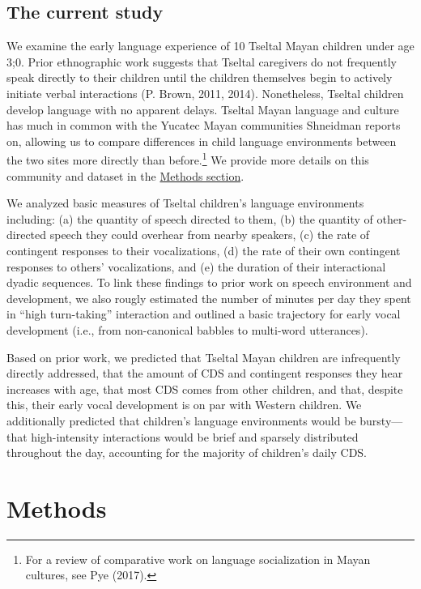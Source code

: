 \documentclass[floatsintext,man]{apa6}
\theoremstyle{definition}
\theoremstyle{definition}
\theoremstyle{definition}
\theoremstyle{remark}
\begin{document}
\subsection{The current study}\label{intro-currentstudy}

We examine the early language experience of 10 Tseltal Mayan children
under age 3;0. Prior ethnographic work suggests that Tseltal caregivers
do not frequently speak directly to their children until the children
themselves begin to actively initiate verbal interactions (P. Brown,
2011, 2014). Nonetheless, Tseltal children develop language with no
apparent delays. Tseltal Mayan language and culture has much in common
with the Yucatec Mayan communities Shneidman reports on, allowing us to
compare differences in child language environments between the two sites
more directly than before.\footnote{For a review of comparative work on
  language socialization in Mayan cultures, see Pye (2017).} We provide
more details on this community and dataset in the
\protect\hyperlink{methods}{Methods section}.

We analyzed basic measures of Tseltal children's language environments
including: (a) the quantity of speech directed to them, (b) the quantity
of other-directed speech they could overhear from nearby speakers, (c)
the rate of contingent responses to their vocalizations, (d) the rate of
their own contingent responses to others' vocalizations, and (e) the
duration of their interactional dyadic sequences. To link these findings
to prior work on speech environment and development, we also rougly
estimated the number of minutes per day they spent in \enquote{high
turn-taking} interaction and outlined a basic trajectory for early vocal
development (i.e., from non-canonical babbles to multi-word utterances).

Based on prior work, we predicted that Tseltal Mayan children are
infrequently directly addressed, that the amount of CDS and contingent
responses they hear increases with age, that most CDS comes from other
children, and that, despite this, their early vocal development is on
par with Western children. We additionally predicted that children's
language environments would be bursty---that high-intensity interactions
would be brief and sparsely distributed throughout the day, accounting
for the majority of children's daily CDS.

\hypertarget{methods}{\section{Methods}\label{methods}}
\end{document}
